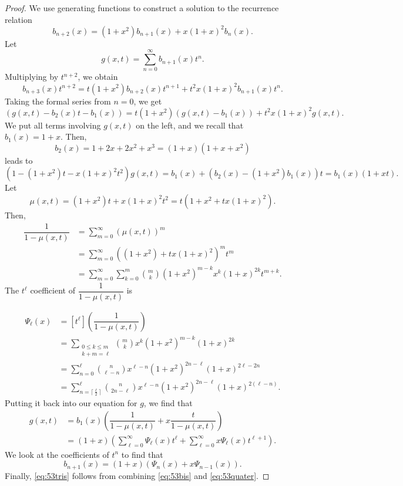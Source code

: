 \documentclass[12pt]{amsart}
\theoremstyle{definition}
\begin{document}
\begin{proof}
    We use generating functions to construct a solution to the recurrence relation 
    \[
    b_{n+2}(x)= (1+x^2) b_{n+1} (x)+ x(1+x)^2b_n(x).
    \] Let 
    \[
    g(x,t)= \sum_{n=0}^\infty b_{n+1}(x) t^n.
    \]  
    Multiplying by $t^{n+2}$, we obtain 
    \[
    b_{n+3}(x)t^{n+2} = t(1+x^2)b_{n+2}(x)t^{n+1} + t^2x(1+x)^2 b_{n+1}(x) t^n.
    \] 
    Taking the formal series from $n=0$, we get 
    \[
    (g(x,t)-b_2(x) t - b_1(x)) = t(1+x^2)(g(x,t) - b_1(x)) + t^2x(1+x)^2 g(x,t).
    \] 
    We put all terms involving $g(x,t)$ on the left, and we recall that $b_1(x) = 1+x$. Then,
    \[
    b_2(x) = 1+2x + 2x^2 + x^3 = (1+x)(1+x+x^2)
    \]
    leads to 
    \[\left(1- (1+x^2)t - x(1+x)^2t^2 \right)g(x,t) = b_1(x) + (b_2(x) - (1+x^2)b_1(x))t = b_1(x)(1 + xt).
    \] 
    Let 
    \begin{equation}\label{eq:53bis}
    \mu(x,t) = (1+x^2)t + x(1+x)^2t^2 = t(1+x^2  + t x(1+x)^2).
    \end{equation}
    Then,
    \begin{align*}
    \dfrac{1}{1-\mu(x,t)} &= \sum_{m=0}^\infty (\mu(x,t))^m \\
    &= \sum_{m=0}^\infty ((1+x^2)+tx(1+x)^2)^m t^m\\
    &= \sum_{m=0}^\infty \sum_{k=0}^m \binom{m}{k} (1+x^2)^{m-k} x^k (1+x)^{2k} t^{m+k}.
    \end{align*}
    The $t^{\ell}$ coefficient of $\dfrac{1}{1-\mu(x,t)}$ is 
    
    \begin{align*}
    \Psi_\ell(x) &= [t^{\ell}]\left(\dfrac{1}{1-\mu(x,t)}\right) \\
    & = \sum_{\substack{0\leq k \leq m \\ k+m=\ell } } \binom{m}{k} x^k (1+x^2)^{m-k}(1+x)^{2k}\\
    &= \sum_{n=0}^{\ell} \binom{n}{\ell-n} x^{\ell-n}(1+x^2)^{2n-\ell} (1+x)^{2\ell - 2n} \\ 
    &= \sum_{n=\lceil\frac{\ell}{2}\rceil }^\ell \binom{n}{2n-\ell} x^{\ell-n} (1+x^2)^{2n-\ell} (1+x)^{2(\ell-n)}.
    \end{align*} 
    Putting it back into our equation for $g$, we find that
    \begin{align}
    g(x,t)  &= b_1(x)\left( \dfrac{1}{1-\mu(x,t)}  + x  \dfrac{t}{1-\mu(x,t)}\right)\label{eq:53quater} \\ 
    & =  (1+x) \left( \sum_{\ell=0}^{\infty} \Psi_\ell(x) t^\ell + \sum_{\ell=0}^\infty x \Psi_\ell(x) t^{\ell +1}\right).
    \end{align}
    We look at the coefficients of $t^n$ to find that
    \[
    b_{n+1}(x) = (1+x) \left(\Psi_n(x) + x \Psi_{n-1}(x)\right). 
    \]
  Finally, \eqref{eq:53tris} follows from combining \eqref{eq:53bis} and \eqref{eq:53quater}.
\end{proof}
\end{document}
